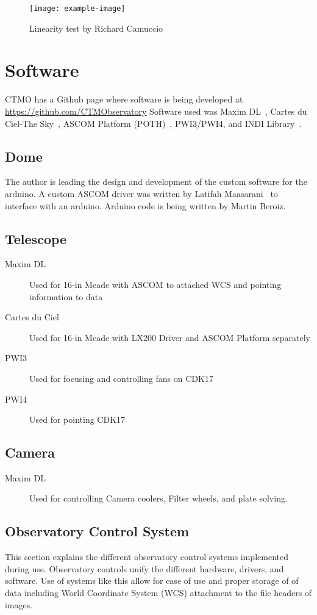 \begin{figure}[h]
    \centering
    \texttt{[image: example-image]}
    \caption{Linearity test by Richard Camuccio}
\label{fig:linearity}
\end{figure}

\section{Software}
CTMO has a Github page where software is being developed at \url{https://github.com/CTMObservatory}
Software used was Maxim DL~\cite{maxim}, Cartes du Ciel-The Sky~\cite{cdc}, ASCOM Platform (POTH)~\cite{ascom},
PWI3/PWI4\cite{planewave}, and INDI Library~\cite{indi}.

\subsection{Dome}
The author is leading the design and development of the custom software for the arduino.
A custom ASCOM driver was written by Latifah Maasarani~\cite{maasarani_2017} to interface 
with an arduino. 
Arduino code is being written by Martin Beroiz.

\subsection{Telescope}
\begin{description}
    \item[Maxim DL] Used for 16-in Meade with ASCOM to attached WCS and pointing information to data
    \item[Cartes du Ciel] Used for 16-in Meade with LX200 Driver and ASCOM Platform separately 
    \item[PWI3] Used for focusing and controlling fans on CDK17
    \item[PWI4] Used for pointing CDK17
\end{description}

\subsection{Camera}
\begin{description}
    \item[Maxim DL] Used for controlling Camera coolers, Filter wheels, and plate solving.
\end{description}

\subsection{Observatory Control System}
This section explains the different observatory control systems implemented during use.
Observatory controls unify the different hardware, drivers, and software. 
Use of systems like this allow for ease of use and proper storage of of data including World Coordinate System (WCS) attachment to 
the file headers of images.

